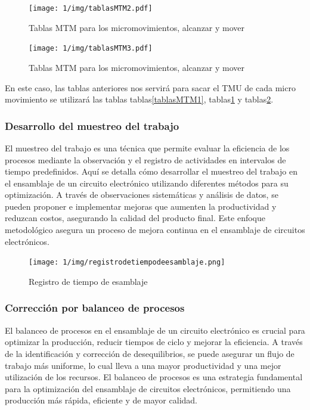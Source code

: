     
         \begin{figure}[H]
            \centering
            \texttt{[image: 1/img/tablasMTM2.pdf]}
            \caption{Tablas MTM para los micromovimientos, alcanzar y mover}
            \label{tablasMTM2}
        \end{figure}
    
    
         \begin{figure}[H]
            \centering
            \texttt{[image: 1/img/tablasMTM3.pdf]}
            \caption{Tablas MTM para los micromovimientos, alcanzar y mover}
            \label{tablasMTM3}
        \end{figure}
    
    En este caso, las tablas anteriores nos servirá para sacar el TMU de cada micro movimiento se utilizará las tablas tablas\ref{tablasMTM1}, tablas\ref{tablasMTM2} y tablas\ref{tablasMTM3}.
    \subsubsection{Desarrollo del muestreo del trabajo}
    
    El muestreo del trabajo es una técnica que permite evaluar la eficiencia de los procesos mediante la observación y el registro de actividades en intervalos de tiempo predefinidos. Aquí se detalla cómo desarrollar el muestreo del trabajo en el ensamblaje de un circuito electrónico utilizando diferentes métodos para su optimización.
    A través de observaciones sistemáticas y análisis de datos, se pueden proponer e implementar mejoras que aumenten la productividad y reduzcan costos, asegurando la calidad del producto final. Este enfoque metodológico asegura un proceso de mejora continua en el ensamblaje de circuitos electrónicos.\cite{Niebel}
    \begin{figure}[H]
        \centering
        \texttt{[image: 1/img/registrodetiempodeesamblaje.png]}
        \caption{Registro de tiempo de esamblaje}
    \end{figure}
    
    \subsubsection{Corrección por balanceo de procesos}
    
    El balanceo de procesos en el ensamblaje de un circuito electrónico es crucial para optimizar la producción, reducir tiempos de ciclo y mejorar la eficiencia. A través de la identificación y corrección de desequilibrios, se puede asegurar un flujo de trabajo más uniforme, lo cual lleva a una mayor productividad y una mejor utilización de los recursos.
    El balanceo de procesos es una estrategia fundamental para la optimización del ensamblaje de circuitos electrónicos, permitiendo una producción más rápida, eficiente y de mayor calidad.\cite{Niebel}
    
